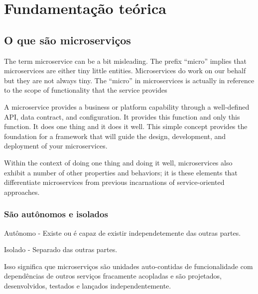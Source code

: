 \chapter{Fundamentação teórica}\label{cap_exemplos}


\section{O que são microserviços}

The term microservice can be a bit misleading. The prefix “micro” implies that microservices are either tiny little entities. Microservices do work on our behalf but they are not always tiny. The “micro” in microservices is actually in reference to the scope of functionality that the service provides

A microservice provides a business or platform capability through a well-defined API, data contract, and configuration. It provides this function and only this function. It does one thing and it does it well. This simple concept provides the foundation for a framework that will guide the design, development, and deployment of your microservices.

Within the context of doing one thing and doing it well, microservices also exhibit a number of other properties and behaviors; it is these elements that differentiate microservices from previous incarnations of service-oriented approaches.

\subsection{São autônomos e isolados}
Autônomo - Existe ou é capaz de existir independetemente das outras partes.

Isolado - Separado das outras partes. 

Isso significa que microserviços são unidades auto-contidas de funcionalidade com dependências de outros serviços fracamente acopladas e são projetados, desenvolvidos, testados e lançados independentemente.

